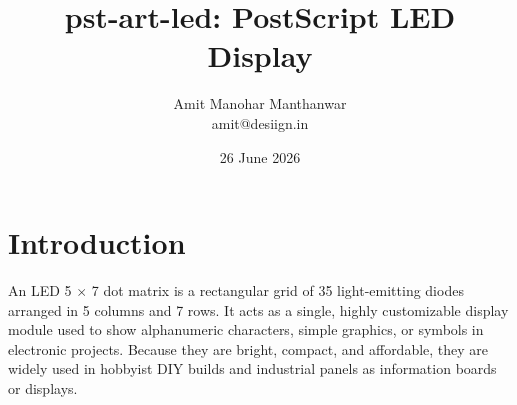 \documentclass[11pt,a4paper]{pst-art}
\title{\textsf{pst-art-led}: PostScript LED Display}
\author{Amit Manohar Manthanwar\\[1mm]amit@desiign.in}
\date{26 June 2026}
\begin{document}
\tableofcontents
\printMetadata
\setlength{\parskip}{15pt}
\setlength{\baselineskip}{13pt}
\setlength{\LTpre}{10pt}%


\begin{figure}[!ht]
\centering%
\end{figure}


\section{Introduction}
An LED 5 $\times$ 7 dot matrix is a rectangular grid of 35 light-emitting diodes arranged in 5 columns and 7 rows. It acts as a single, highly customizable display module used to show alphanumeric characters, simple graphics, or symbols in electronic projects. Because they are bright, compact, and affordable, they are widely used in hobbyist DIY builds and industrial panels as information boards or displays.
\end{document}
